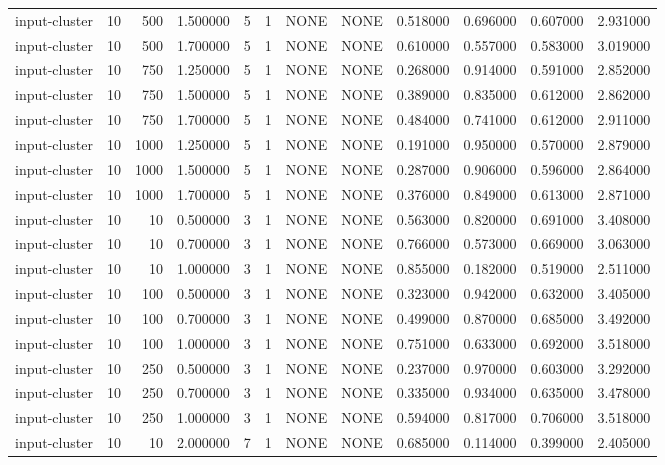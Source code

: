 \begin{tabular}{lrrrllllrrrr}
input-cluster & 10 & 500 & 1.500000 & 5 & 1 & NONE & NONE & 0.518000 & 0.696000 & 0.607000 & 2.931000 \\
input-cluster & 10 & 500 & 1.700000 & 5 & 1 & NONE & NONE & 0.610000 & 0.557000 & 0.583000 & 3.019000 \\
input-cluster & 10 & 750 & 1.250000 & 5 & 1 & NONE & NONE & 0.268000 & 0.914000 & 0.591000 & 2.852000 \\
input-cluster & 10 & 750 & 1.500000 & 5 & 1 & NONE & NONE & 0.389000 & 0.835000 & 0.612000 & 2.862000 \\
input-cluster & 10 & 750 & 1.700000 & 5 & 1 & NONE & NONE & 0.484000 & 0.741000 & 0.612000 & 2.911000 \\
input-cluster & 10 & 1000 & 1.250000 & 5 & 1 & NONE & NONE & 0.191000 & 0.950000 & 0.570000 & 2.879000 \\
input-cluster & 10 & 1000 & 1.500000 & 5 & 1 & NONE & NONE & 0.287000 & 0.906000 & 0.596000 & 2.864000 \\
input-cluster & 10 & 1000 & 1.700000 & 5 & 1 & NONE & NONE & 0.376000 & 0.849000 & 0.613000 & 2.871000 \\
input-cluster & 10 & 10 & 0.500000 & 3 & 1 & NONE & NONE & 0.563000 & 0.820000 & 0.691000 & 3.408000 \\
input-cluster & 10 & 10 & 0.700000 & 3 & 1 & NONE & NONE & 0.766000 & 0.573000 & 0.669000 & 3.063000 \\
input-cluster & 10 & 10 & 1.000000 & 3 & 1 & NONE & NONE & 0.855000 & 0.182000 & 0.519000 & 2.511000 \\
input-cluster & 10 & 100 & 0.500000 & 3 & 1 & NONE & NONE & 0.323000 & 0.942000 & 0.632000 & 3.405000 \\
input-cluster & 10 & 100 & 0.700000 & 3 & 1 & NONE & NONE & 0.499000 & 0.870000 & 0.685000 & 3.492000 \\
input-cluster & 10 & 100 & 1.000000 & 3 & 1 & NONE & NONE & 0.751000 & 0.633000 & 0.692000 & 3.518000 \\
input-cluster & 10 & 250 & 0.500000 & 3 & 1 & NONE & NONE & 0.237000 & 0.970000 & 0.603000 & 3.292000 \\
input-cluster & 10 & 250 & 0.700000 & 3 & 1 & NONE & NONE & 0.335000 & 0.934000 & 0.635000 & 3.478000 \\
input-cluster & 10 & 250 & 1.000000 & 3 & 1 & NONE & NONE & 0.594000 & 0.817000 & 0.706000 & 3.518000 \\
input-cluster & 10 & 10 & 2.000000 & 7 & 1 & NONE & NONE & 0.685000 & 0.114000 & 0.399000 & 2.405000 \\

\end{tabular}
